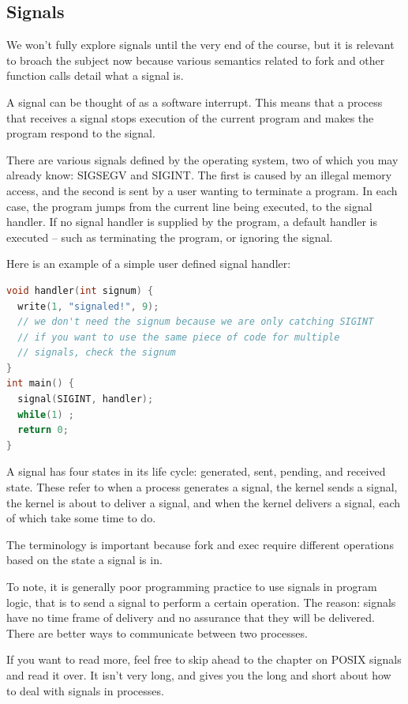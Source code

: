 \subsection{Signals}

We won't fully explore signals until the very end of the course, but it is relevant to broach the subject now because various semantics related to fork and other function calls detail what a signal is.

A signal can be thought of as a software interrupt. This means that a process that receives a signal stops execution of the current program and makes the program respond to the signal.

There are various signals defined by the operating system, two of which you may already know: SIGSEGV and SIGINT. The first is caused by an illegal memory access, and the second is sent by a user wanting to terminate a program. In each case, the program jumps from the current line being executed, to the signal handler. If no signal handler is supplied by the program, a default handler is executed -- such as terminating the program, or ignoring the signal.

Here is an example of a simple user defined signal handler:

\begin{lstlisting}[language=C]
void handler(int signum) {
  write(1, "signaled!", 9);
  // we don't need the signum because we are only catching SIGINT
  // if you want to use the same piece of code for multiple
  // signals, check the signum
}
int main() {
  signal(SIGINT, handler);
  while(1) ;
  return 0;
}
\end{lstlisting}

A signal has four states in its life cycle: generated, sent, pending, and received state. These refer to when a process generates a signal, the kernel sends a signal, the kernel is about to deliver a signal, and when the kernel delivers a signal, each of which take some time to do.

The terminology is important because fork and exec require different operations based on the state a signal is in.

To note, it is generally poor programming practice to use signals in program logic, that is to send a signal to perform a certain operation.
The reason: signals have no time frame of delivery and no assurance that they will be delivered.
There are better ways to communicate between two processes.

If you want to read more, feel free to skip ahead to the chapter on POSIX signals and read it over. It isn't very long, and gives you the long and short about how to deal with signals in processes.

